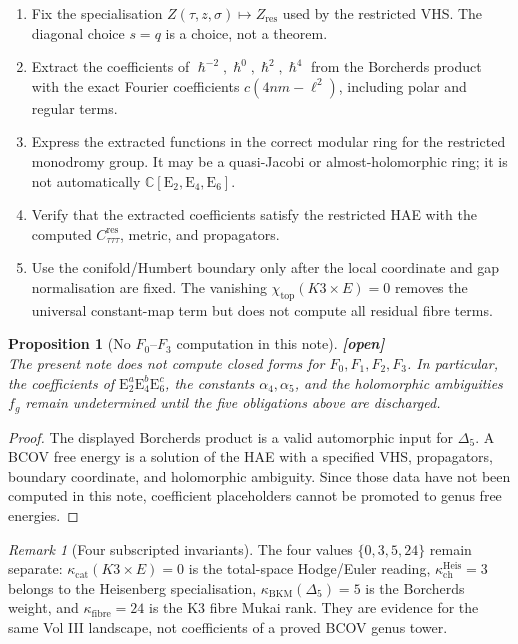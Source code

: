 \documentclass[11pt]{article}
\theoremstyle{plain}
\newtheorem{proposition}[theorem]{Proposition}
\theoremstyle{definition}
\theoremstyle{remark}
\newtheorem{remark}[theorem]{Remark}
\providecommand{\C}{\mathbb{C}}
\providecommand{\hbar}{\hslash}
\providecommand{\kch}{\kappa_{\mathrm{ch}}}
\providecommand{\kcat}{\kappa_{\mathrm{cat}}}
\providecommand{\kBKM}{\kappa_{\mathrm{BKM}}}
\providecommand{\kfib}{\kappa_{\mathrm{fibre}}}
\providecommand{\Eis}{\mathrm{E}}
\providecommand{\ClaimStatusOpen}[1][]{\textbf{[open]}}
\begin{document}
\begin{enumerate}[label=\textup{(C\arabic*)},leftmargin=*]
\item Fix the specialisation \(Z(\tau,z,\sigma)\mapsto Z_{\mathrm{res}}\)
used by the restricted VHS. The diagonal choice \(s=q\) is a choice, not
a theorem.
\item Extract the coefficients of \(\hbar^{-2},\hbar^0,\hbar^2,\hbar^4\)
from the Borcherds product with the exact Fourier coefficients
\(c(4nm-\ell^2)\), including polar and regular terms.
\item Express the extracted functions in the correct modular ring for
the restricted monodromy group. It may be a quasi-Jacobi or
almost-holomorphic ring; it is not automatically
\(\C[\Eis_2,\Eis_4,\Eis_6]\).
\item Verify that the extracted coefficients satisfy the restricted
HAE with the computed \(C_{\tau\tau\tau}^{\mathrm{res}}\), metric, and
propagators.
\item Use the conifold/Humbert boundary only after the local coordinate
and gap normalisation are fixed. The vanishing
\(\chi_{\mathrm{top}}(K3\times E)=0\) removes the universal constant-map
term but does not compute all residual fibre terms.
\end{enumerate}

\begin{proposition}[No $F_0$--$F_3$ computation in this note]
\label{prop:no-F0-F3-computation}
\ClaimStatusOpen{}\\
The present note does not compute closed forms for
\(F_0,F_1,F_2,F_3\). In particular, the coefficients of
\(\Eis_2^a\Eis_4^b\Eis_6^c\), the constants
\(\alpha_4,\alpha_5\), and the holomorphic ambiguities \(f_g\) remain
undetermined until the five obligations above are discharged.
\end{proposition}

\begin{proof}
The displayed Borcherds product is a valid automorphic input for
\(\Delta_5\). A BCOV free energy is a solution of the HAE with a
specified VHS, propagators, boundary coordinate, and holomorphic
ambiguity. Since those data have not been computed in this note,
coefficient placeholders cannot be promoted to genus free energies.
\end{proof}

\begin{remark}[Four subscripted invariants]
The four values \(\{0,3,5,24\}\) remain separate:
\(\kcat(K3\times E)=0\) is the total-space Hodge/Euler reading,
\(\kch^{\mathrm{Heis}}=3\) belongs to the Heisenberg specialisation,
\(\kBKM(\Delta_5)=5\) is the Borcherds weight, and
\(\kfib=24\) is the K3 fibre Mukai rank. They are evidence for the
same Vol III landscape, not coefficients of a proved BCOV genus tower.
\end{remark}
\end{document}
